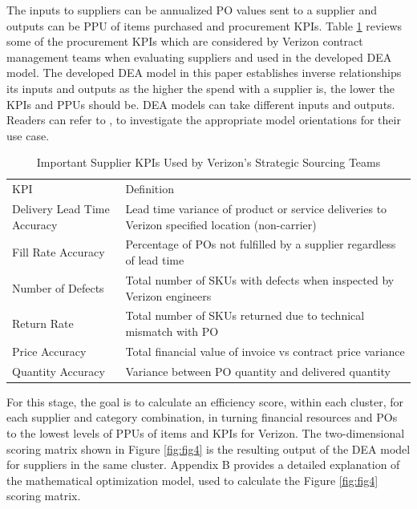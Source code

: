 \documentclass[inte,nonblindrev]{informs3} %
\begin{document}
The inputs to suppliers can be annualized PO values sent to a supplier and outputs can be PPU of items purchased and procurement KPIs. Table \ref{tabel:tbl3} reviews some of the procurement KPIs which are considered by Verizon contract management teams when evaluating suppliers and used in the developed DEA model. The developed DEA model in this paper establishes inverse relationships its inputs and outputs as the higher the spend with a supplier is, the lower the KPIs and PPUs should be. DEA models can take different inputs and outputs. Readers can refer to \cite{r3}, to investigate the appropriate model orientations for their use case.

\begin{center}
\begin{table}
	\begin{tabular}{>{\centering\arraybackslash}m{5 cm} | >{\centering\arraybackslash}m{11 cm}}
	\multicolumn{2}{c}{}\\
	\hline
	KPI & Definition \\ 
	\hline
	\multirow{6}{*}{} 
	Delivery Lead Time Accuracy & Lead time variance of product or service deliveries to Verizon  specified location (non-carrier) \\
 	Fill Rate Accuracy & Percentage of POs not fulfilled by a supplier regardless of lead time \\
 	Number of Defects & Total number of SKUs with defects when inspected by Verizon engineers \\
 	Return Rate & Total number of SKUs returned due to technical mismatch with PO \\
 	Price Accuracy & Total financial value of invoice vs contract price variance \\ 
 	Quantity Accuracy & Variance between PO quantity and delivered quantity \\
	\hline
	\end{tabular}
	\caption{Important Supplier KPIs Used by Verizon's Strategic Sourcing Teams}
	\label{tabel:tbl3}
\end{table}
\end{center}

For this stage, the goal is to calculate an efficiency score, within each cluster, for each supplier and category combination, in turning financial resources and POs to the lowest levels of PPUs of items and KPIs for Verizon. The two-dimensional scoring matrix shown in Figure \ref{fig:fig4} is the resulting output of the DEA model for suppliers in the same cluster. Appendix B provides a detailed explanation of the mathematical optimization model, used to calculate the Figure \ref{fig:fig4} scoring matrix.
\end{document}
